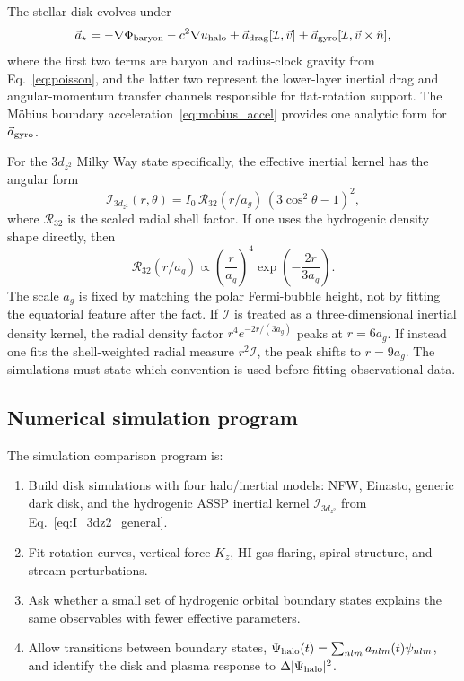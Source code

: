 \documentclass[11pt,a4paper]{article}
\begin{document}
The stellar disk evolves under
\begin{equation}
  \vec a_\star=-\nabla\Phi_{\rm baryon}-c^2\nabla u_{\rm halo}
  +\vec a_{\rm drag}[\mathcal I,\vec v]
  +\vec a_{\rm gyro}[\mathcal I,\vec v\times\hat n],
  \label{eq:disk_dynamics}
\end{equation}
where the first two terms are baryon and radius-clock gravity from
Eq.~\eqref{eq:poisson}, and the latter two represent the lower-layer inertial
drag and angular-momentum transfer channels responsible for flat-rotation
support. The M\"obius boundary acceleration~\eqref{eq:mobius_accel} provides
one analytic form for $\vec a_{\rm gyro}$.

For the $3d_{z^2}$ Milky Way state specifically, the effective inertial kernel
has the angular form
\begin{equation}
  \mathcal I_{3d_{z^2}}(r,\theta)
  =I_0\,\mathcal R_{32}(r/a_g)\,(3\cos^2\theta-1)^2,
  \label{eq:I_3dz2_general}
\end{equation}
where $\mathcal R_{32}$ is the scaled radial shell factor. If one uses the
hydrogenic density shape directly, then
\begin{equation}
  \mathcal R_{32}(r/a_g)
  \propto
  \left(\frac{r}{a_g}\right)^4
  \exp\!\left(-\frac{2r}{3a_g}\right).
  \label{eq:R32_shape}
\end{equation}
The scale $a_g$ is fixed by matching the polar Fermi-bubble height, not by
fitting the equatorial feature after the fact.  If $\mathcal I$ is treated as a
three-dimensional inertial density kernel, the radial density factor
$r^4e^{-2r/(3a_g)}$ peaks at $r=6a_g$.  If instead one fits the shell-weighted
radial measure $r^2\mathcal I$, the peak shifts to $r=9a_g$.  The simulations
must state which convention is used before fitting observational data.

\subsection{Numerical simulation program}

The simulation comparison program is:
\begin{enumerate}[label=\textbf{S\arabic*.}]
  \item Build disk simulations with four halo/inertial models: NFW, Einasto,
        generic dark disk, and the hydrogenic ASSP inertial kernel
        $\mathcal I_{3d_{z^2}}$ from Eq.~\eqref{eq:I_3dz2_general}.
  \item Fit rotation curves, vertical force $K_z$, HI gas flaring, spiral
        structure, and stream perturbations.
  \item Ask whether a small set of hydrogenic orbital boundary states explains
        the same observables with fewer effective parameters.
  \item Allow transitions between boundary states,
        $\Psi_{\rm halo}(t)=\sum_{nlm}a_{nlm}(t)\psi_{nlm}$, and identify the
        disk and plasma response to $\Delta|\Psi_{\rm halo}|^2$.
\end{enumerate}
\end{document}
